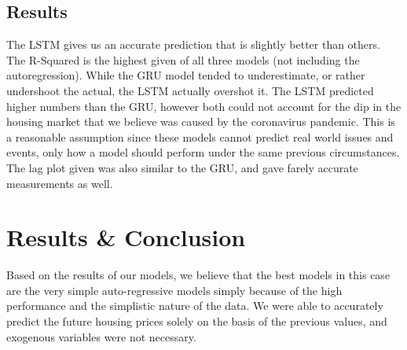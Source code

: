 \documentclass{article}
\begin{document}
	\subsection{Results}

	The LSTM gives us an accurate prediction that is slightly better than others. The R-Squared is the
	highest given of all three models (not including the autoregression). While the GRU model tended to
	underestimate, or rather undershoot the actual, the LSTM actually overshot it. The LSTM predicted
	higher numbers than the GRU, however both could not account for the dip in the housing market that 
	we believe was caused by the coronavirus pandemic. This is a reasonable assumption since these models
	cannot predict real world issues and events, only how a model should perform under the same previous
	circumstances. The lag plot given was also similar to the GRU, and gave farely accurate measurements
	as well.
	
	\section{Results \& Conclusion}
	
	Based on the results of our models, we believe that the best models in this case are the very simple auto-regressive models 
	simply because of the high performance and the simplistic nature of the data. We were able to accurately predict the 
	future housing prices solely on the basis of the previous values, and exogenous variables were not necessary.  

	
\end{document}
